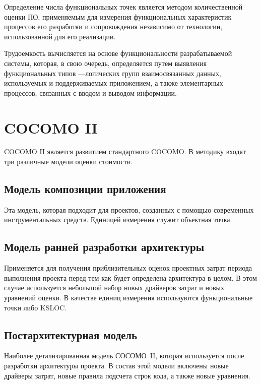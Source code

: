 Определение числа функциональных точек является методом количественной оценки ПО, применяемым для измерения функциональных характеристик процессов его разработки и сопровождения независимо от технологии, использованной для его реализации.

Трудоемкость вычисляется на основе функциональности разрабатываемой системы, которая, в свою очередь, определяется путем выявления функциональных типов —логических групп взаимосвязанных данных, используемых и поддерживаемых приложением, а также элементарных процессов, связанных с вводом и выводом информации.

\chapter{COCOMO II}

COCOMO II является развитием стандартного COCOMO. В методику входят три различные модели оценки стоимости.

\section{Модель композиции приложения}
Эта модель, которая подходит для проектов, созданных с помощью современных инструментальных средств. Единицей измерения служит объектная точка.

\section{Модель ранней разработки архитектуры}

Применяется для получения приблизительных оценок проектных затрат периода выполнения проекта перед тем как будет определена архитектура в целом. В этом случае используется небольшой набор новых драйверов затрат и новых уравнений оценки. В качестве единиц измерения используются функциональные точки либо KSLOC.

\section{Постархитектурная модель}

Наиболее детализированная модель \mbox{СОСОМО II}, которая используется после разработки архитектуры проекта. В состав этой модели включены новые драйверы затрат, новые правила подсчета строк кода, а также новые уравнения.


